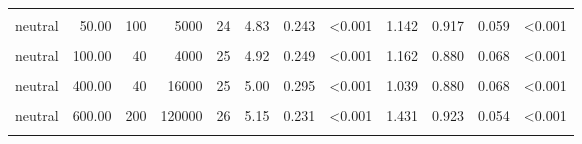 \documentclass[
]{article}
\begin{document}
\begin{longtable}[t]{lrrrrrrlrrrl}
\hspace{1em}\cellcolor{gray!10}{neutral} & \cellcolor{gray!10}{50.00} & \cellcolor{gray!10}{10} & \cellcolor{gray!10}{500} & \cellcolor{gray!10}{23} & \cellcolor{gray!10}{4.26} & \cellcolor{gray!10}{0.303} & \cellcolor{gray!10}{0.016} & \cellcolor{gray!10}{0.535} & \cellcolor{gray!10}{0.826} & \cellcolor{gray!10}{0.083} & \cellcolor{gray!10}{0.003}\\
\hspace{1em}neutral & 50.00 & 100 & 5000 & 24 & 4.83 & 0.243 & <0.001 & 1.142 & 0.917 & 0.059 & <0.001\\
\hspace{1em}\cellcolor{gray!10}{neutral} & \cellcolor{gray!10}{100.00} & \cellcolor{gray!10}{30} & \cellcolor{gray!10}{3000} & \cellcolor{gray!10}{24} & \cellcolor{gray!10}{4.54} & \cellcolor{gray!10}{0.282} & \cellcolor{gray!10}{0.003} & \cellcolor{gray!10}{0.771} & \cellcolor{gray!10}{0.792} & \cellcolor{gray!10}{0.087} & \cellcolor{gray!10}{0.007}\\
\hspace{1em}neutral & 100.00 & 40 & 4000 & 25 & 4.92 & 0.249 & <0.001 & 1.162 & 0.880 & 0.068 & <0.001\\
\hspace{1em}\cellcolor{gray!10}{neutral} & \cellcolor{gray!10}{400.00} & \cellcolor{gray!10}{10} & \cellcolor{gray!10}{4000} & \cellcolor{gray!10}{28} & \cellcolor{gray!10}{5.14} & \cellcolor{gray!10}{0.163} & \cellcolor{gray!10}{<0.001} & \cellcolor{gray!10}{1.937} & \cellcolor{gray!10}{0.964} & \cellcolor{gray!10}{0.036} & \cellcolor{gray!10}{<0.001}\\
\hspace{1em}neutral & 400.00 & 40 & 16000 & 25 & 5.00 & 0.295 & <0.001 & 1.039 & 0.880 & 0.068 & <0.001\\
\hspace{1em}\cellcolor{gray!10}{neutral} & \cellcolor{gray!10}{600.00} & \cellcolor{gray!10}{20} & \cellcolor{gray!10}{12000} & \cellcolor{gray!10}{25} & \cellcolor{gray!10}{5.12} & \cellcolor{gray!10}{0.285} & \cellcolor{gray!10}{<0.001} & \cellcolor{gray!10}{1.162} & \cellcolor{gray!10}{0.920} & \cellcolor{gray!10}{0.057} & \cellcolor{gray!10}{<0.001}\\
\hspace{1em}neutral & 600.00 & 200 & 120000 & 26 & 5.15 & 0.231 & <0.001 & 1.431 & 0.923 & 0.054 & <0.001\\
\hspace{1em}\cellcolor{gray!10}{neutral} & \cellcolor{gray!10}{800.00} & \cellcolor{gray!10}{30} & \cellcolor{gray!10}{24000} & \cellcolor{gray!10}{25} & \cellcolor{gray!10}{5.20} & \cellcolor{gray!10}{0.220} & \cellcolor{gray!10}{<0.001} & \cellcolor{gray!10}{1.574} & \cellcolor{gray!10}{0.920} & \cellcolor{gray!10}{0.057} & \cellcolor{gray!10}{<0.001}\\

\end{longtable}
\end{document}
